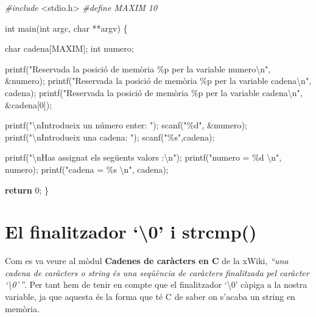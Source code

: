 \documentclass[]{book}
\newenvironment{Shaded}{\begin{snugshade}}{\end{snugshade}}
\newcommand{\ControlFlowTok}[1]{\textcolor[rgb]{0.13,0.29,0.53}{\textbf{#1}}}
\newcommand{\DataTypeTok}[1]{\textcolor[rgb]{0.13,0.29,0.53}{#1}}
\newcommand{\DecValTok}[1]{\textcolor[rgb]{0.00,0.00,0.81}{#1}}
\newcommand{\ImportTok}[1]{#1}
\newcommand{\NormalTok}[1]{#1}
\newcommand{\PreprocessorTok}[1]{\textcolor[rgb]{0.56,0.35,0.01}{\textit{#1}}}
\newcommand{\SpecialCharTok}[1]{\textcolor[rgb]{0.00,0.00,0.00}{#1}}
\newcommand{\StringTok}[1]{\textcolor[rgb]{0.31,0.60,0.02}{#1}}
\begin{document}
\begin{Shaded}
\begin{Highlighting}[]
\PreprocessorTok{\#include }\ImportTok{\textless{}stdio.h\textgreater{}}
\PreprocessorTok{\#define MAXIM 10}

\DataTypeTok{int}\NormalTok{ main(}\DataTypeTok{int}\NormalTok{ argc, }\DataTypeTok{char}\NormalTok{ **argv) \{}

    \DataTypeTok{char}\NormalTok{ cadena[MAXIM];}
    \DataTypeTok{int}\NormalTok{ numero;}

\NormalTok{    printf(}\StringTok{"Reservada la posició de memòria \%p per la variable numero}\SpecialCharTok{\textbackslash{}n}\StringTok{"}\NormalTok{, \&numero);}
\NormalTok{    printf(}\StringTok{"Reservada la posició de memòria \%p per la variable cadena}\SpecialCharTok{\textbackslash{}n}\StringTok{"}\NormalTok{, cadena);}
\NormalTok{    printf(}\StringTok{"Reservada la posició de memòria \%p per la variable cadena}\SpecialCharTok{\textbackslash{}n}\StringTok{"}\NormalTok{, \&cadena[}\DecValTok{0}\NormalTok{]);}

\NormalTok{    printf(}\StringTok{"}\SpecialCharTok{\textbackslash{}n}\StringTok{Introdueix un número enter: "}\NormalTok{);}
\NormalTok{    scanf(}\StringTok{"\%d"}\NormalTok{, \&numero);}
\NormalTok{    printf(}\StringTok{"}\SpecialCharTok{\textbackslash{}n}\StringTok{Introdueix una cadena: "}\NormalTok{);}
\NormalTok{    scanf(}\StringTok{"\%s"}\NormalTok{,cadena);}

\NormalTok{    printf(}\StringTok{"}\SpecialCharTok{\textbackslash{}n}\StringTok{Has assignat els següents valors :}\SpecialCharTok{\textbackslash{}n}\StringTok{"}\NormalTok{);}
\NormalTok{    printf(}\StringTok{"numero = \%d }\SpecialCharTok{\textbackslash{}n}\StringTok{"}\NormalTok{, numero);}
\NormalTok{    printf(}\StringTok{"cadena = \%s }\SpecialCharTok{\textbackslash{}n}\StringTok{"}\NormalTok{, cadena);}

    \ControlFlowTok{return} \DecValTok{0}\NormalTok{;}
\NormalTok{\}}
\end{Highlighting}
\end{Shaded}

\hypertarget{el-finalitzador-0-i-strcmp}{%
\section{El finalitzador `\textbackslash0' i strcmp()}\label{el-finalitzador-0-i-strcmp}}

Com es va veure al mòdul \textbf{Cadenes de caràcters en C} de la xWiki, \emph{``una cadena de caràcters o string és una seqüència de caràcters finalitzada pel caràcter `\textbackslash0'\,''}. Per tant hem de tenir en compte que el finalitzador `\textbackslash0' càpiga a la nostra variable, ja que aquesta és la forma que té C de saber on s'acaba un string en memòria.
\end{document}
